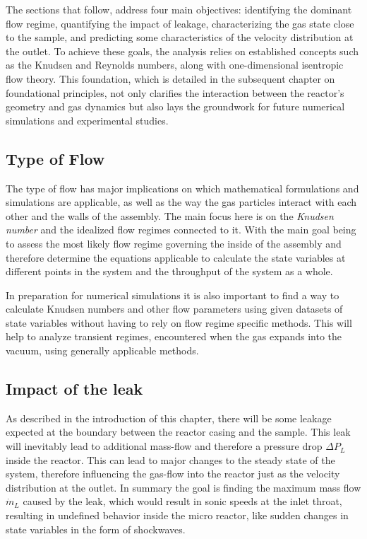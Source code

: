 	The sections that follow, address four main objectives: identifying the dominant flow regime, quantifying the impact of leakage, characterizing the gas state close to the sample, and predicting some characteristics of the velocity distribution at the outlet.
	To achieve these goals, the analysis relies on established concepts such as the Knudsen and Reynolds numbers, along with one-dimensional isentropic flow theory.
	This foundation, which is detailed in the subsequent chapter on foundational principles, not only clarifies the interaction between the reactor’s geometry and gas dynamics but also lays the groundwork for future numerical simulations and experimental studies.	

\subsection{Type of Flow}

	The type of flow has major implications on which mathematical formulations and simulations are applicable, as well as the way the gas particles interact with each other and the walls of the assembly. 
	The main focus here is on the \emph{Knudsen number} and the idealized flow regimes connected to it.
	With the main goal being to assess the most likely flow regime governing the inside of the assembly and therefore determine the equations applicable to calculate the state variables at different points in the system and the throughput of the system as a whole.

	In preparation for numerical simulations it is also important to find a way to calculate Knudsen numbers and other flow parameters using given datasets of state variables without having to rely on flow regime specific methods. This will help to analyze transient regimes, encountered when the gas expands into the vacuum, using generally applicable methods.

\subsection{Impact of the leak}

	As described in the introduction of this chapter, there will be some leakage expected at the boundary between the reactor casing and the sample.
	This leak will inevitably lead to additional mass-flow and therefore a pressure drop $\Delta P_L$ inside the reactor.
	This can lead to major changes to the steady state of the system, therefore influencing the gas-flow into the reactor just as the velocity distribution at the outlet.
	In summary the goal is finding the maximum mass flow $\dot{m}_L$ caused by the leak, which would result in sonic speeds at the inlet throat, resulting in undefined behavior inside the micro reactor, like sudden changes in state variables in the form of shockwaves. 

